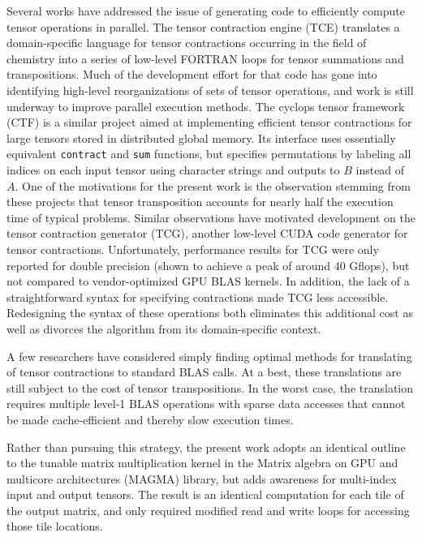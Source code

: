 \documentclass[preprint]{sigplanconf}
\begin{document}
  Several works have addressed the issue of generating code to efficiently
compute tensor operations in parallel.%
  The tensor contraction engine (TCE) translates
a domain-specific language for tensor contractions occurring in the field of
chemistry into a series of low-level FORTRAN loops for tensor
summations and transpositions.\cite{tce}  Much of the development effort for that
code has gone into identifying high-level reorganizations of sets of tensor operations,
and work is still underway to improve parallel execution methods.
The cyclops tensor framework (CTF)\cite{ctf} is a similar project aimed at
implementing efficient tensor contractions for large tensors stored
in distributed global memory.  Its interface uses essentially equivalent {\tt contract} and {\tt sum}
functions, but specifies permutations by labeling all indices on each input tensor
using character strings and outputs to $B$ instead of $A$.
One of the motivations for the present work is the observation stemming from these projects
that tensor transposition accounts for nearly half the execution time of typical problems.\cite{spaghetty}
Similar observations have motivated development on the tensor contraction generator (TCG),
another low-level CUDA code generator for tensor contractions.\cite{tcg,wma11}
Unfortunately, performance results for TCG were only reported for double precision
(shown to achieve a peak of around 40 Gflops), but not compared to vendor-optimized GPU
BLAS kernels.  In addition, the lack of a straightforward syntax for specifying contractions
made TCG less accessible.
Redesigning the syntax of these operations both eliminates
this additional cost as well as divorces the algorithm from its domain-specific context.

  A few researchers have considered simply finding optimal methods for
translating of tensor contractions to standard BLAS calls.\cite{slice}
At a best, these translations are still subject to the
cost of tensor transpositions.  In the worst case, the translation requires multiple
level-1 BLAS operations with sparse data accesses that cannot be made cache-efficient
and thereby slow execution times.

  Rather than pursuing this strategy, the present work adopts an identical
outline to the tunable matrix multiplication kernel in the Matrix algebra on
GPU and multicore architectures (MAGMA) library,\cite{magma}
but adds awareness for multi-index input and output tensors.  The result
is an identical computation for each tile of the output matrix, and only required
modified read and write loops for accessing those tile locations.
\end{document}
